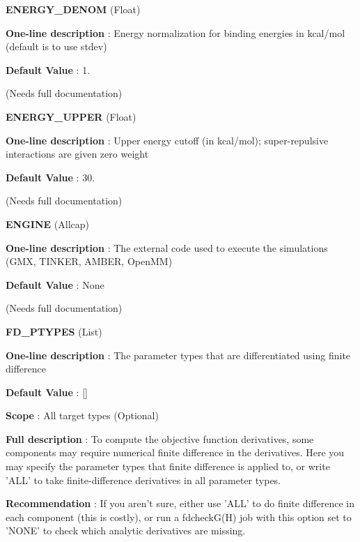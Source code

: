 \begin{DoxyItemize}
\item {\bfseries  \-E\-N\-E\-R\-G\-Y\-\_\-\-D\-E\-N\-O\-M } (\-Float) \par
{\bfseries  \-One-\/line description }\-: \-Energy normalization for binding energies in kcal/mol (default is to use stdev) \par
{\bfseries  \-Default \-Value }\-: 1. \par
(\-Needs full documentation)\end{DoxyItemize}
\begin{DoxyItemize}
\item {\bfseries  \-E\-N\-E\-R\-G\-Y\-\_\-\-U\-P\-P\-E\-R } (\-Float) \par
{\bfseries  \-One-\/line description }\-: \-Upper energy cutoff (in kcal/mol); super-\/repulsive interactions are given zero weight \par
{\bfseries  \-Default \-Value }\-: 30. \par
(\-Needs full documentation)\end{DoxyItemize}
\begin{DoxyItemize}
\item {\bfseries  \-E\-N\-G\-I\-N\-E } (\-Allcap) \par
{\bfseries  \-One-\/line description }\-: \-The external code used to execute the simulations (\-G\-M\-X, \-T\-I\-N\-K\-E\-R, \-A\-M\-B\-E\-R, \-Open\-M\-M) \par
{\bfseries  \-Default \-Value }\-: \-None \par
(\-Needs full documentation)\end{DoxyItemize}
\begin{DoxyItemize}
\item {\bfseries  \-F\-D\-\_\-\-P\-T\-Y\-P\-E\-S } (\-List) \par
{\bfseries  \-One-\/line description }\-: \-The parameter types that are differentiated using finite difference \par
{\bfseries  \-Default \-Value }\-: \mbox{[}\mbox{]} \par
{\bfseries  \-Scope }\-: \-All target types (\-Optional) \par
{\bfseries  \-Full description }\-: \-To compute the objective function derivatives, some components may require numerical finite difference in the derivatives. \-Here you may specify the parameter types that finite difference is applied to, or write '\-A\-L\-L' to take finite-\/difference derivatives in all parameter types. \par
{\bfseries  \-Recommendation }\-: \-If you aren't sure, either use '\-A\-L\-L' to do finite difference in each component (this is costly), or run a fdcheck\-G(\-H) job with this option set to '\-N\-O\-N\-E' to check which analytic derivatives are missing.\end{DoxyItemize}
